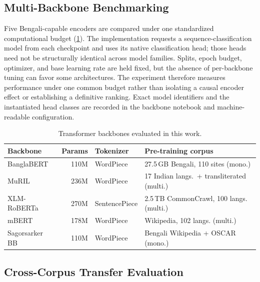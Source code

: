 \documentclass{ieeeaccess}
\begin{document}
\subsection{Multi-Backbone Benchmarking}
\label{sec:phase-multibackbone}

Five Bengali-capable encoders are compared under one standardized computational budget (\cref{tab:backbones}). The implementation requests a sequence-classification model from each checkpoint and uses its native classification head; those heads need not be structurally identical across model families. Splits, epoch budget, optimizer, and base learning rate are held fixed, but the absence of per-backbone tuning can favor some architectures. The experiment therefore measures performance under one common budget rather than isolating a causal encoder effect or establishing a definitive ranking. Exact model identifiers and the instantiated head classes are recorded in the backbone notebook and machine-readable configuration.

\begin{table}[!t]
\centering
\caption{Transformer backbones evaluated in this work.}
\label{tab:backbones}
\footnotesize
\setlength{\tabcolsep}{3pt}
\begin{tabularx}{\columnwidth}{@{}lrlX@{}}
\toprule
\textbf{Backbone} & \textbf{Params} & \textbf{Tokenizer} & \textbf{Pre-training corpus} \\
\midrule
BanglaBERT \cite{bhattacharjee2022banglabert} & 110M & WordPiece & 27.5\,GB Bengali, 110 sites (mono.) \\
MuRIL \cite{khanuja2021muril} & 236M & WordPiece & 17 Indian langs.\ + transliterated (multi.) \\
XLM-RoBERTa \cite{conneau2020xlmr} & 270M & SentencePiece & 2.5\,TB CommonCrawl, 100 langs. (multi.) \\
mBERT \cite{devlin2019bert} & 178M & WordPiece & Wikipedia, 102 langs. (multi.) \\
Sagorsarker BB & 110M & WordPiece & Bengali Wikipedia + OSCAR (mono.) \\
\bottomrule
\end{tabularx}
\end{table}

\subsection{Cross-Corpus Transfer Evaluation}
\label{sec:phase-crossdataset}
\end{document}
